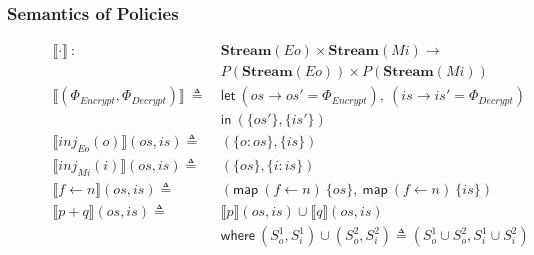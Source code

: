 \documentclass[12pt, letterpaper]{article}
\newcommand\interp[1]{\llbracket #1 \rrbracket}
\begin{document}
      \subsubsection{Semantics of Policies}\label{sec:spec:sem:pol}
        \begin{figure}
          \centering
          \begin{align*} 
            \interp{ \cdot }\ 
              :\ \ &
              \mathbf{Stream}(Eo)\times \mathbf{Stream}(Mi) \rightarrow \\
              & P(\mathbf{Stream}(Eo))\times P(\mathbf{Stream}(Mi)) 
              \\
            \interp{(\Phi_{Encrypt}, \Phi_{Decrypt})}\
              \triangleq\
              & \mathsf{let}\ (os \rightarrow os' = \Phi_{Encrypt}),
                            \ (is \rightarrow is' = \Phi_{Decrypt})\\
              & \mathsf{in}\
              (\{\mathit{os'}\}, \{\mathit{is'}\})
              \\
            \interp { inj_{Eo}(o) }(\mathit{os}, \mathit{is})
              \triangleq\ &
              (\{\mathit{o : os}\}, \{\mathit{is}\}) 
              \\
            \interp { inj_{Mi}(i) }(\mathit{os}, \mathit{is})
              \triangleq\ &
              (\{\mathit{os}\},\{ \mathit{i : is}\})
              \\
            \interp { f \leftarrow n }(os, is)
              \triangleq\ &
              (\mathsf{map}\ (f\leftarrow n)\ \{os\},\
               \mathsf{map}\ (f\leftarrow n)\ \{is\})
              \\ %
            \interp { p + q }(\mathit{os}, \mathit{is})
              \triangleq\ &
              \interp { p }(\mathit{os}, \mathit{is})\cup
              \interp { q }(\mathit{os}, \mathit{is}) \\
              &\mathsf{where}\ (S_o^1, S_i^1)\cup (S_o^2, S_i^2)\triangleq
                (S_o^1\cup S_o^2, S_i^1\cup S_i^2)\\

\end{align*}
\end{figure}
\end{document}
